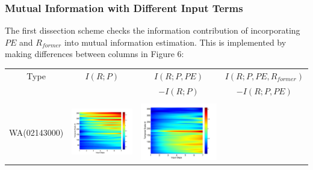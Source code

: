 \documentclass[review]{elsarticle}
\begin{document}
\subsubsection{Mutual Information with Different Input Terms}
The first dissection scheme checks the information contribution of incorporating $PE$ and $R_{former}$ into mutual information estimation. This is implemented by making differences between columns in Figure 6:
\begin{table}[H]\small
\label{PER}
\centering
\begin{tabular}{cccc}
\hline
Type&$I(R;P)$&$I(R;P,PE) $&$I(R;P,PE,R_{former}) $\\
 & &$ -I(R;P)$&$ -I(R;P,PE)$\\\hline
\\
WA(02143000)
&\begin{minipage}{.3\textwidth}\includegraphics[width=\linewidth]{resultgraph/02143000p.png}\end{minipage}
&\begin{minipage}{.3\textwidth}\includegraphics[width=\linewidth]{resultgraph/02143000diff_ep.png}\end{minipage}

\end{tabular}
\end{table}
\end{document}
